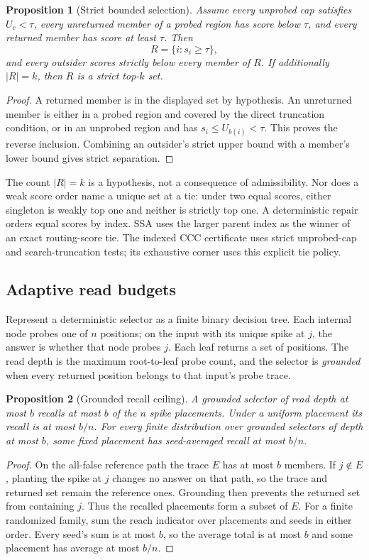 \documentclass[11pt]{article}
\numberwithin{equation}{section}
\newtheorem{proposition}{Proposition}
\begin{document}
\begin{proposition}[Strict bounded selection]\label{prop:app-bounded-top}
Assume every unprobed cap satisfies $U_c<\tau$, every unreturned member of a probed region has score below
$\tau$, and every returned member has score at least $\tau$. Then
\[
R=\{i:s_i\ge\tau\},
\]
and every outsider scores strictly below every member of $R$. If additionally $|R|=k$, then $R$ is a strict
top-$k$ set.
\end{proposition}
\begin{proof}
A returned member is in the displayed set by hypothesis. An unreturned member is either in a probed region
and covered by the direct truncation condition, or in an unprobed region and has
$s_i\le U_{b(i)}<\tau$. This proves the reverse inclusion. Combining an outsider's strict upper bound with a
member's lower bound gives strict separation.
\end{proof}

The count $|R|=k$ is a hypothesis, not a consequence of admissibility. Nor does a weak score order name a
unique set at a tie: under two equal scores, either singleton is weakly top one and neither is strictly top
one. A deterministic repair orders equal scores by index. SSA uses the larger parent index as the winner of
an exact routing-score tie. The indexed CCC certificate uses strict unprobed-cap and search-truncation tests;
its exhaustive corner uses this explicit tie policy.

\subsection{Adaptive read budgets}

Represent a deterministic selector as a finite binary decision tree. Each internal node probes one of $n$
positions; on the input with its unique spike at $j$, the answer is whether that node probes $j$. Each leaf
returns a set of positions. The read depth is the maximum root-to-leaf probe count, and the selector is
\emph{grounded} when every returned position belongs to that input's probe trace.

\begin{proposition}[Grounded recall ceiling]\label{prop:app-read-miss}
A grounded selector of read depth at most $b$ recalls at most $b$ of the $n$ spike placements. Under a uniform
placement its recall is at most $b/n$. For every finite distribution over grounded selectors of depth at most
$b$, some fixed placement has seed-averaged recall at most $b/n$.
\end{proposition}
\begin{proof}
On the all-false reference path the trace $E$ has at most $b$ members. If $j\notin E$, planting the spike at
$j$ changes no answer on that path, so the trace and returned set remain the reference ones. Grounding then
prevents the returned set from containing $j$. Thus the recalled placements form a subset of $E$. For a
finite randomized family, sum the reach indicator over placements and seeds in either order. Every seed's sum
is at most $b$, so the average total is at most $b$ and some placement has average at most $b/n$.
\end{proof}
\end{document}

